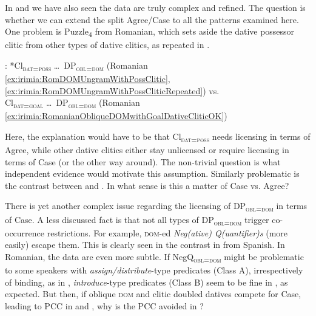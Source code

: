 \documentclass[output=paper,colorlinks,citecolor=brown,draft,draftmode]{langscibook}
\begin{document}

In  and  we have also seen  the data are truly complex and refined. The question is whether we can extend the split Agree/Case to all the patterns examined here. One problem is Puzzle\textsubscript{4} from Romanian, which sets aside the dative possessor clitic from other types of dative clitics, as repeated in  .

: *Cl\textsubscript{\textsc{dat=poss}}  \ldots\, DP\textsubscript{\textsc{obl=dom}} ({Romanian} \ref{ex:irimia:RomDOMUngramWithPossClitic},  \ref{ex:irimia:RomDOMUngramWithPossCliticRepeated}) vs. \\
\indent \hskip 1.5cm \Checkmark Cl\textsubscript{\textsc{dat=goal}} \ldots\, DP\textsubscript{\textsc{obl=dom}} ({Romanian} \ref{ex:irimia:RomanianObliqueDOMwithGoalDativeCliticOK})
\label{ex:irimia:Puzzle3Repeated}
\z

\largerpage
Here, the explanation would have to be that Cl\textsubscript{\textsc{dat=poss}} needs licensing in terms of Agree, while other dative clitics either stay unlicensed or require licensing in terms of Case (or the other way around). The non-trivial question is what independent evidence would motivate this assumption. Similarly problematic is the contrast between  and . In what sense is this  a matter of Case vs. Agree?

There is yet another complex issue regarding the licensing of DP\textsubscript{\textsc{obl=dom}} in terms of Case. A less discussed fact is that not all types of DP\textsubscript{\textsc{obl=dom}} trigger co-occurrence restrictions. For example, \textsc{dom}-ed \textit{Neg(ative) Q(uantifier)s} (more easily) escape them. This is clearly seen in the contrast in  from Spanish. In Romanian, the data are even more subtle. If NegQ\textsubscript{\textsc{obl=dom}} might be problematic to some speakers with \textit{assign/distribute}-type predicates (Class A), irrespectively of binding, as in , \textit{introduce}-type predicates (Class B) seem to be fine in , as expected. But then, if oblique \textsc{dom} and clitic doubled datives compete for Case, leading to \textsc{PCC} in  and , why is the \textsc{PCC} avoided in ?
\end{document}
